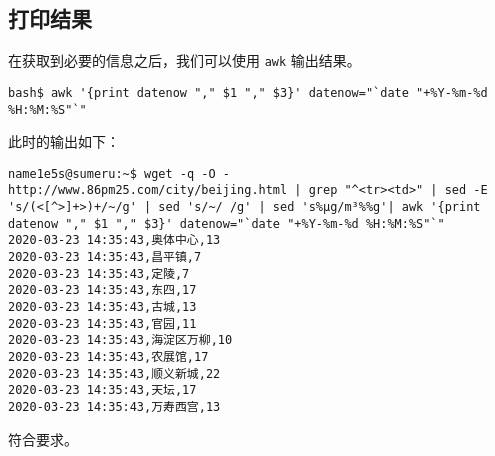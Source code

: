 \documentclass[blue,normal,cn]{elegantnote}
\newcommand{\code}[1]{\colorbox{light-gray}{\texttt{#1}}}
\begin{document}
\subsection{打印结果}

在获取到必要的信息之后，我们可以使用 \code{awk} 输出结果。

\begin{lstlisting}
bash$ awk '{print datenow "," $1 "," $3}' datenow="`date "+%Y-%m-%d %H:%M:%S"`"
\end{lstlisting}

此时的输出如下：

\begin{lstlisting}
name1e5s@sumeru:~$ wget -q -O -  http://www.86pm25.com/city/beijing.html | grep "^<tr><td>" | sed -E 's/(<[^>]+>)+/~/g' | sed 's/~/ /g' | sed 's%μg/m³%%g'| awk '{print datenow "," $1 "," $3}' datenow="`date "+%Y-%m-%d %H:%M:%S"`"
2020-03-23 14:35:43,奥体中心,13
2020-03-23 14:35:43,昌平镇,7
2020-03-23 14:35:43,定陵,7
2020-03-23 14:35:43,东四,17
2020-03-23 14:35:43,古城,13
2020-03-23 14:35:43,官园,11
2020-03-23 14:35:43,海淀区万柳,10
2020-03-23 14:35:43,农展馆,17
2020-03-23 14:35:43,顺义新城,22
2020-03-23 14:35:43,天坛,17
2020-03-23 14:35:43,万寿西宫,13
\end{lstlisting}

符合要求。
\end{document}
